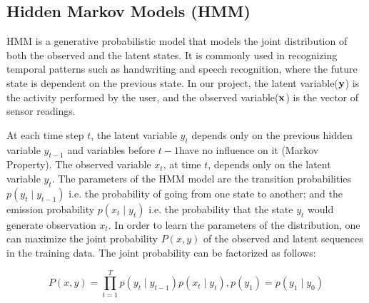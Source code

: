 \documentclass[11pt, oneside]{article}   	%
\begin{document}
\subsection{Hidden Markov Models (HMM)}
HMM is a generative probabilistic model that models the joint distribution of both the observed and the latent states. It is commonly used in recognizing temporal patterns such as handwriting and speech recognition, where the future state is dependent on the previous state.  In our project, the latent variable($\bf{y}$) is the activity performed by the user, and the observed variable($\bf{x}$) is the vector of sensor readings. 

At each time step $t$, the latent variable $y_t$ depends only on the previous hidden variable $y_{t-1}$ and variables before $t-1$have no influence on it (Markov Property). The observed variable $x_t$, at time $t$, depends only on the latent variable $y_t$. The parameters of the HMM model are the transition probabilities $p(y_{t}\mid y_{t-1})$ i.e.  the probability of going from one state to another; and the emission probability $p(x_{t}\mid y_{t})$ i.e. the probability that the state $y_t$ would generate observation $x_{t}$. In order to learn the parameters of the distribution, one can maximize the joint probability $P(x,y)$ of the observed and latent sequences in the training data. The joint probability can be factorized as follows:


\begin{equation}
P(x,y)=\prod_{t=1}^{T}p(y_{t}\mid y_{t-1})p(x_{t}\mid y_{t}), p(y_{1}) = p(y_{1}\mid y_{0})
\end{equation}
\end{document}
